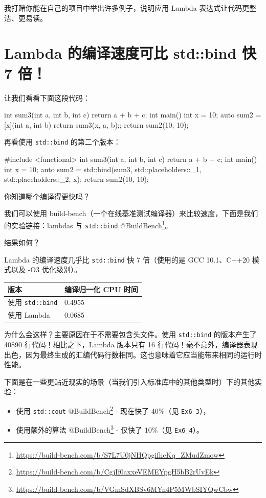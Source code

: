 我打赌你能在自己的项目中举出许多例子，说明应用 Lambda 表达式让代码更整洁、更易读。

\section{Lambda 的编译速度可比 std::bind 快 7 倍！}

让我们看看下面这段代码：

\begin{codebox}
int sum3(int a, int b, int c) {
return a + b + c;
}
int main() {
int x = 10;
auto sum2 = [x](int a, int b) { return sum3(x, a, b);};
return sum2(10, 10);
}
\end{codebox}

再看使用 \texttt{std::bind} 的第二个版本：

\begin{codebox}
#include <functional>
int sum3(int a, int b, int c) {
return a + b + c;
}
int main() {
int x = 10;
auto sum2 = std::bind(sum3, std::placeholders::_1,
std::placeholders::_2, x);
return sum2(10, 10);
}
\end{codebox}

你知道哪个编译得更快吗？

我们可以使用 build-bench（一个在线基准测试编译器）来比较速度，下面是我们的实验链接：lambdas 与 \texttt{std::bind} @BuildBench\footnote{\url{https://build-bench.com/b/S7L7U0jNHQpgifhcKq_ZMudZmow}}。

结果如何？


Lambda 的编译速度几乎比 \texttt{std::bind} 快 7 倍（使用的是 GCC 10.1、C++20 模式以及 -O3 优化级别）。

\begin{tabular}{ll}
\hline
版本 & 编译归一化 CPU 时间 \\
\hline
使用 \texttt{std::bind} & 0.4955 \\
使用 Lambda & 0.0685 \\
\hline
\end{tabular}

为什么会这样？主要原因在于不需要包含头文件。使用 \texttt{std::bind} 的版本产生了 40890 行代码！相比之下，Lambda 版本只有 16 行代码！毫不意外，编译器表现出色，因为最终生成的汇编代码行数相同。这也意味着它应当能带来相同的运行时性能。

下面是在一些更贴近现实的场景（当我们引入标准库中的其他类型时）下的其他实验：

\begin{itemize}
\item 使用 \texttt{std::cout} @BuildBench\footnote{\url{https://build-bench.com/b/CgjIf0axxeVEMEYpgH5bB2rUvEk}} - 现在快了 40\%（见 \texttt{Ex6\_3}），
\item 使用额外的算法 @BuildBench\footnote{\url{https://build-bench.com/b/VGmSdXBSv6MYn4P5MWbSIYQwCbw}} - 仅快了 10\%（见 \texttt{Ex6\_4}）。
\end{itemize}

